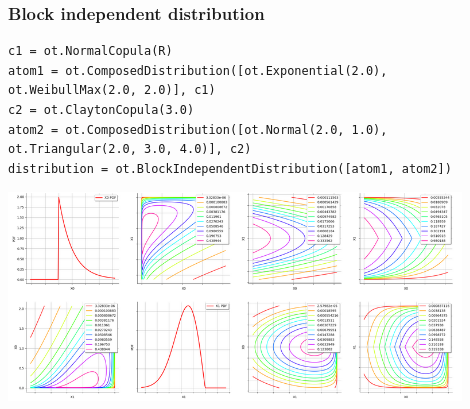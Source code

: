 \documentclass{beamer}
\begin{document}
\begin{frame}[containsverbatim]
\frametitle{Block independent distribution}



\begin{adjustbox}{max width=\textwidth}
\begin{lstlisting}
c1 = ot.NormalCopula(R)
atom1 = ot.ComposedDistribution([ot.Exponential(2.0), ot.WeibullMax(2.0, 2.0)], c1)
c2 = ot.ClaytonCopula(3.0)
atom2 = ot.ComposedDistribution([ot.Normal(2.0, 1.0), ot.Triangular(2.0, 3.0, 4.0)], c2)
distribution = ot.BlockIndependentDistribution([atom1, atom2])
\end{lstlisting}
\end{adjustbox}

\begin{center}
\includegraphics[width=0.9\textwidth]{figures/blockindepdist.png}
\end{center}


\end{frame}
\end{document}
